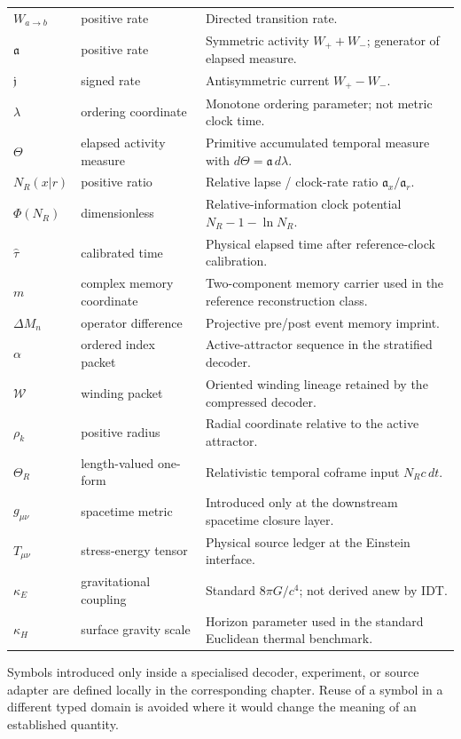 \documentclass[11pt]{book}
\begin{document}
\begin{longtable}{p{}p{}p{}}
\(W_{a\to b}\) & positive rate & Directed transition rate. \\
\(\mathfrak a\) & positive rate & Symmetric activity \(W_++W_-\); generator of elapsed measure. \\
\(\mathfrak j\) & signed rate & Antisymmetric current \(W_+-W_-\). \\
\(\lambda\) & ordering coordinate & Monotone ordering parameter; not metric clock time. \\
\(\Theta\) & elapsed activity measure & Primitive accumulated temporal measure with \(d\Theta=\mathfrak a\,d\lambda\). \\
\(N_R(x|r)\) & positive ratio & Relative lapse / clock-rate ratio \(\mathfrak a_x/\mathfrak a_r\). \\
\(\Phi(N_R)\) & dimensionless & Relative-information clock potential \(N_R-1-\ln N_R\). \\
\(\widehat\tau\) & calibrated time & Physical elapsed time after reference-clock calibration. \\
\(m\) & complex memory coordinate & Two-component memory carrier used in the reference reconstruction class. \\
\(\Delta M_n\) & operator difference & Projective pre/post event memory imprint. \\
\(\alpha\) & ordered index packet & Active-attractor sequence in the stratified decoder. \\
\(\mathcal W\) & winding packet & Oriented winding lineage retained by the compressed decoder. \\
\(\rho_k\) & positive radius & Radial coordinate relative to the active attractor. \\
\(\Theta_R\) & length-valued one-form & Relativistic temporal coframe input \(N_Rc\,dt\). \\
\(g_{\mu\nu}\) & spacetime metric & Introduced only at the downstream spacetime closure layer. \\
\(T_{\mu\nu}\) & stress-energy tensor & Physical source ledger at the Einstein interface. \\
\(\kappa_E\) & gravitational coupling & Standard \(8\pi G/c^4\); not derived anew by IDT. \\
\(\kappa_H\) & surface gravity scale & Horizon parameter used in the standard Euclidean thermal benchmark. \\
\bottomrule
\end{longtable}
\normalsize

Symbols introduced only inside a specialised decoder, experiment, or source adapter are defined locally in the corresponding chapter. Reuse of a symbol in a different typed domain is avoided where it would change the meaning of an established quantity.
\end{document}
